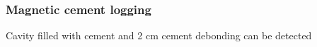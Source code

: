 \documentclass[aspectratio=169]{beamer}
\begin{document}
\begin{frame}
\frametitle{Magnetic cement logging}
Cavity filled with cement and 2 cm cement debonding can be detected 

\begin{minipage}[h]{0.21\linewidth}
 \\

\end{minipage}
\end{frame}
\end{document}
